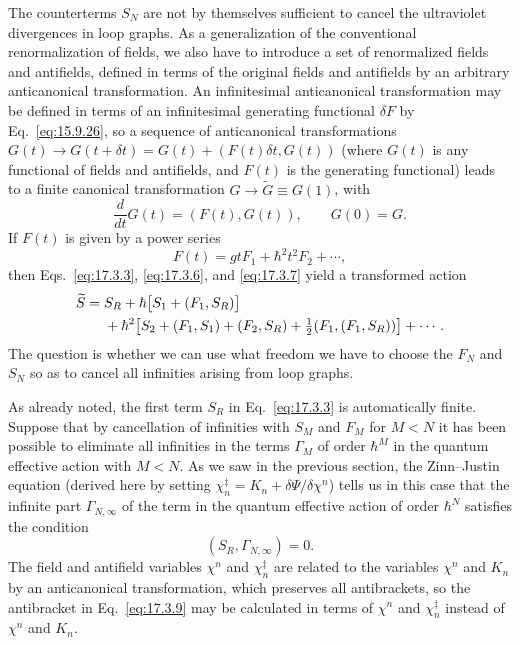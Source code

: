 The counterterms $S_N$ are not by themselves sufficient to cancel the
ultraviolet divergences in loop graphs. As a generalization of the
conventional renormalization of fields, we also have to introduce a set of
renormalized fields and antifields, defined in terms of the original fields
and antifields by an arbitrary anticanonical transformation. An infinitesimal
anticanonical transformation may be defined in terms of an infinitesimal
generating functional $\delta F$ by Eq.~\eqref{eq:15.9.26}, so a sequence of
anticanonical transformations
$G(t)\longrightarrow G(t+\delta t)=G(t)+(F(t)\delta t,G(t))$ (where $G(t)$
is any functional of fields and antifields, and $F(t)$ is the generating
functional) leads to a finite canonical transformation
$G\longrightarrow\widetilde G\equiv G(1)$, with
\begin{equation}
\frac{d}{dt}G(t)=(F(t),G(t)),
\qquad G(0)=G.
\label{eq:17.3.6}
\end{equation}
If $F(t)$ is given by a power series
\begin{equation}
F(t)=gtF_1+\hbar^2t^2F_2+\cdots,
\label{eq:17.3.7}
\end{equation}
then Eqs.~\eqref{eq:17.3.3}, \eqref{eq:17.3.6}, and \eqref{eq:17.3.7}
yield a transformed action
\begin{align}
\widetilde S={}&S_R+\hbar\bigl[S_1+(F_1,S_R)\bigr] \notag\\
&+\hbar^2\bigl[S_2+(F_1,S_1)+(F_2,S_R)
+\tfrac12(F_1,(F_1,S_R))\bigr]+\cdots.
\label{eq:17.3.8}
\end{align}
The question is whether we can use what freedom we have to choose the $F_N$
and $S_N$ so as to cancel all infinities arising from loop graphs.

As already noted, the first term $S_R$ in Eq.~\eqref{eq:17.3.3} is
automatically finite. Suppose that by cancellation of infinities with $S_M$
and $F_M$ for $M<N$ it has been possible to eliminate all infinities in the
terms $\Gamma_M$ of order $\hbar^M$ in the quantum effective action with
$M<N$. As we saw in the previous section, the Zinn--Justin equation (derived
here by setting $\chi_n^{\ddagger}=K_n+\delta\Psi/\delta\chi^n$) tells us in
this case that the infinite part $\Gamma_{N,\infty}$ of the term in the
quantum effective action of order $\hbar^N$ satisfies the condition
\begin{equation}
(S_R,\Gamma_{N,\infty})=0.
\label{eq:17.3.9}
\end{equation}
The field and antifield variables $\chi^n$ and $\chi_n^{\ddagger}$ are related
to the variables $\chi^n$ and $K_n$ by an anticanonical transformation, which
preserves all antibrackets, so the antibracket in Eq.~\eqref{eq:17.3.9} may be
calculated in terms of $\chi^n$ and $\chi_n^{\ddagger}$ instead of $\chi^n$
and $K_n$.

